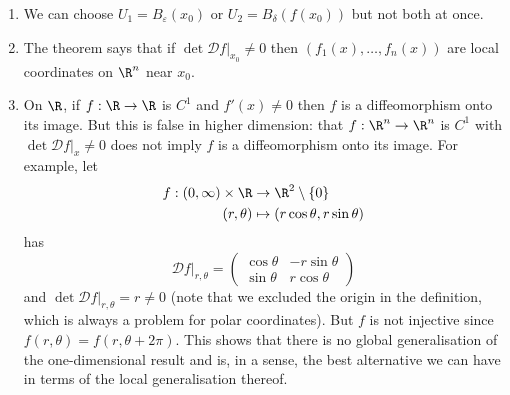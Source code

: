 \documentclass[a4paper]{article}
\newcommand*{\D}{\mathcal{D}}
\theoremstyle{definition}
\begin{document}
\begin{remark}\leavevmode
  \begin{enumerate}
  \item We can choose \(U_1 = B_\varepsilon(x_0)\) or \(U_2 = B_\delta(f(x_0))\) but not both at once.
  \item The theorem says that if \(\det \D f|_{x_0} \neq 0\) then \((f_1(x), \dots, f_n(x))\) are local coordinates on \(\R^n\) near \(x_0\).
  \item On \(\R\), if \(f: \R \to \R\) is \(C^1\) and \(f'(x) \neq 0\) then \(f\) is a diffeomorphism onto its image. But this is false in higher dimension: that \(f: \R^n \to \R^n\) is \(C^1\) with \(\det \D f|_x \neq 0\) does not imply \(f\) is a diffeomorphism onto its image. For example, let
    \begin{align*}
      f: (0, \infty) \times \R &\to \R^2 \setminus \{0\} \\
      (r, \theta) &\mapsto (r \cos \theta, r \sin \theta)
    \end{align*}
    has
    \[
      \D f|_{r, \theta} =
      \begin{pmatrix}
        \cos \theta & -r \sin \theta \\
        \sin \theta & r \cos \theta
      \end{pmatrix}
    \]
    and \(\det \D f|_{r, \theta} = r \neq 0\) (note that we excluded the origin in the definition, which is always a problem for polar coordinates). But \(f\) is not injective since \(f(r, \theta) = f(r, \theta + 2\pi)\). This shows that there is no global generalisation of the one-dimensional result and  is, in a sense, the best alternative we can have in terms of the local generalisation thereof.
  \end{enumerate}
\end{remark}
\end{document}
